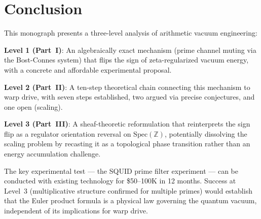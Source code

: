 \documentclass[11pt,a4paper]{article}
\newcommand{\Spec}{\mathrm{Spec}}
\begin{document}
\section*{Conclusion}

This monograph presents a three-level analysis of arithmetic vacuum engineering:

\textbf{Level 1 (Part~I)}: An algebraically exact mechanism (prime channel muting
via the Bost-Connes system) that flips the sign of zeta-regularized vacuum energy,
with a concrete and affordable experimental proposal.

\textbf{Level 2 (Part~II)}: A ten-step theoretical chain connecting this mechanism
to warp drive, with seven steps established, two argued via precise conjectures,
and one open (scaling).

\textbf{Level 3 (Part~III)}: A sheaf-theoretic reformulation that reinterprets the
sign flip as a regulator orientation reversal on $\Spec(\mathbb{Z})$, potentially
dissolving the scaling problem by recasting it as a topological phase transition
rather than an energy accumulation challenge.

The key experimental test --- the SQUID prime filter experiment --- can be
conducted with existing technology for \$50--100K in 12 months.
Success at Level~3 (multiplicative structure confirmed for multiple primes)
would establish that the Euler product formula is a physical law governing the
quantum vacuum, independent of its implications for warp drive.
\end{document}
